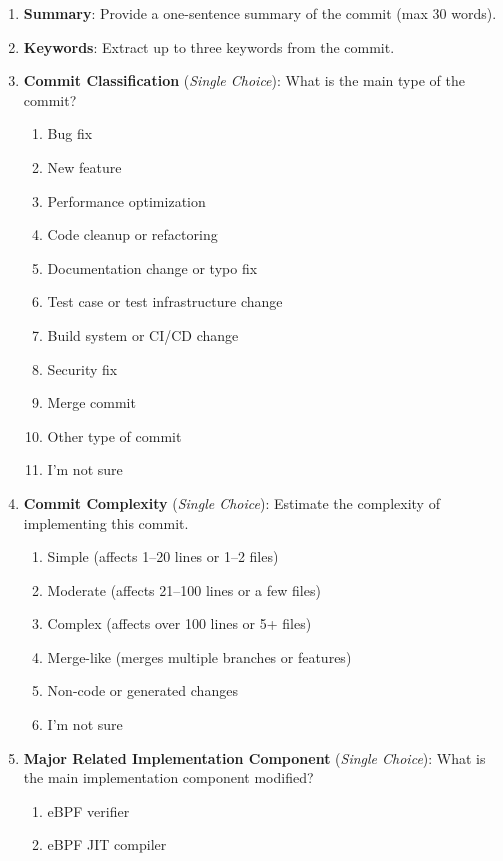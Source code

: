 \begin{enumerate}
    \item \textbf{Summary}: Provide a one-sentence summary of the commit (max 30 words).
    \item \textbf{Keywords}: Extract up to three keywords from the commit.
    \item \textbf{Commit Classification} (\emph{Single Choice}): What is the main type of the commit?
    \begin{enumerate}[label=(\alph*)]
        \item Bug fix
        \item New feature
        \item Performance optimization
        \item Code cleanup or refactoring
        \item Documentation change or typo fix
        \item Test case or test infrastructure change
        \item Build system or CI/CD change
        \item Security fix
        \item Merge commit
        \item Other type of commit
        \item I'm not sure
    \end{enumerate}
    \item \textbf{Commit Complexity} (\emph{Single Choice}): Estimate the complexity of implementing this commit.
    \begin{enumerate}[label=(\alph*)]
        \item Simple (affects 1--20 lines or 1--2 files)
        \item Moderate (affects 21--100 lines or a few files)
        \item Complex (affects over 100 lines or 5+ files)
        \item Merge-like (merges multiple branches or features)
        \item Non-code or generated changes
        \item I'm not sure
    \end{enumerate}
    \item \textbf{Major Related Implementation Component} (\emph{Single Choice}): What is the main implementation component modified?
    \begin{enumerate}[label=(\alph*)]
        \item eBPF verifier
        \item eBPF JIT compiler

\end{enumerate}
\end{enumerate}

